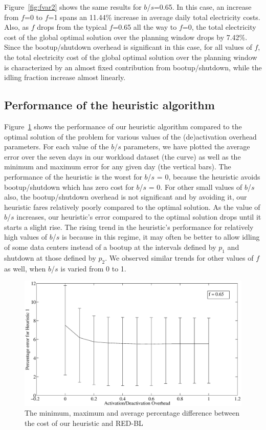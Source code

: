 Figure~\ref{fig:fvar2} shows the same results for $b$/$s$=0.65. In this case, an increase from $f$=0 to $f$=1 spans an 11.44\% increase in average daily total electricity costs. Also, as $f$ drops from the typical $f$=0.65 all the way to $f$=0, the total electricity cost of the global optimal solution over the planning window drops by 7.42\%. Since the bootup/shutdown overhead is significant in this case, for all values of $f$, the total electricity cost of the global optimal solution over the planning window is characterized by an almost fixed contribution from bootup/shutdown, while the idling fraction increase almost linearly.

\subsection{Performance of the heuristic algorithm}
Figure~\ref{fig:heur1perf} shows the performance of our heuristic algorithm compared to the optimal solution of the problem for various values of the (de)activation overhead parameters. For each value of the $b$/$s$ parameters, we have plotted the average error over the seven days in our workload dataset (the curve) as well as the minimum and maximum error for any given day (the vertical bars). The performance of the heuristic is the worst for $b$/$s$ = 0, because the heuristic avoids bootup/shutdown which has zero cost for $b$/$s$ = 0. For other small values of $b$/$s$ also, the bootup/shutdown overhead is not significant and by avoiding it, our heuristic fares relatively poorly compared to the optimal solution. As the value of $b$/$s$ increases, our heuristic's error compared to the optimal solution drops until it starts a slight rise. The rising trend in the heuristic's performance for relatively high values of $b$/$s$ is because in this regime, it may often be better to allow idling of some data centers instead of a bootup at the intervals defined by $p_1$ and shutdown at those defined by $p_2$. We observed similar trends for other values of $f$ as well, when $b$/$s$ is varied from 0 to 1.

\begin{figure}
\includegraphics[width=0.8\linewidth]{pics/rb-heur1error.eps}
\caption{The minimum, maximum and average percentage difference between the cost of our heuristic and RED-BL}
\label{fig:heur1perf}
\end{figure}

